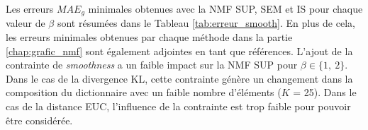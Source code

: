 \begin{table}[h!]
\centering
\caption{Erreurs $MAE_{60}$ les plus faibles pour les combinaisons optimales de modalités des estimateurs pour le corpus d'évaluation \textit{SOUR} en présence d'une pondération de régularité temporelle.}
\label{tab:erreur_smooth}
\end{table}

Les erreurs $MAE_g$ minimales obtenues avec la NMF SUP, SEM et IS pour chaque valeur de $\beta$ sont résumées dans le Tableau \ref{tab:erreur_smooth}. En plus de cela, les erreurs minimales obtenues par chaque méthode dans la partie \ref{chap:grafic_nmf} sont également adjointes en tant que références.
L'ajout de la contrainte de \textit{smoothness} a un faible impact sur la NMF SUP pour $\beta \in \lbrace 1,~2 \rbrace$. Dans le cas de la divergence KL, cette contrainte génère un changement dans la composition du dictionnaire avec un faible nombre d'éléments ($K$ = 25). Dans le cas de la distance EUC, l'influence de la contrainte est trop faible pour pouvoir être considérée.

